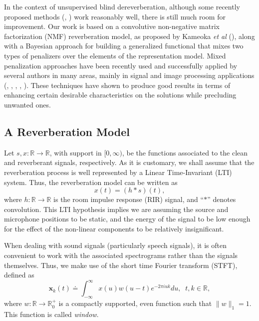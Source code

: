 \documentclass[12pt]{article}
\begin{document}
In the context of unsupervised blind dereverberation, although some recently proposed methods (\cite{wisdom2014}, \cite{kameoka2009}) work reasonably well, there is still much room for improvement. Our work is based on a convolutive non-negative matrix factorization (NMF) reverberation model, as proposed by Kameoka \emph{et al} (\cite{kameoka2009}), along with a Bayesian approach for building a generalized functional that mixes two types of penalizers over the elements of the representation model. Mixed penalization approaches have been recently used and successfully applied by several authors in many areas, mainly in signal and image processing applications (\cite{ibarrola2017l2bva}, \cite{lazzaro2015}, \cite{ibarrola2017inp}, \cite{peterson2017}, \cite{mazzieri2015}). These techniques have shown to produce good results in terms of enhancing certain desirable characteristics on the solutions while precluding unwanted ones.



\subsection{A Reverberation Model}

Let $s, x:\mathbb{R}\rightarrow\mathbb{R}$, with support in $[0, \infty)$, be the functions associated to the clean and reverberant signals, respectively. As it is customary, we shall assume that the reverberation process is well represented by a Linear Time-Invariant (LTI) system. Thus, the reverberation model can be written as
%
\begin{equation} \label{eq:cont-model}
x(t) = (h\ast s)(t),
\end{equation}
%
where $h:\mathbb{R}\rightarrow\mathbb{R}$ is the room impulse response (RIR) signal, and ``$\ast$'' denotes convolution. This LTI hypothesis implies we are assuming the source and microphone positions to be static, and the energy of the signal to be low enough for the effect of the non-linear components to be relatively insignificant.

When dealing with sound signals (particularly speech signals), it is often convenient to work with the associated spectrograms rather than the signals themselves. Thus, we make use of the short time Fourier transform (STFT), defined as
%
\begin{equation}\nonumber%
\mathbf{x}_k(t) \doteq \int_{-\infty}^{\infty}x(u)w(u-t)e^{-2\pi i u k}du,\;\;t,k\in\mathbb{R},
\end{equation}
%
where $w:\mathbb{R}\rightarrow\mathbb{R}^+_0$ is a compactly supported, even function such that $\|w\|_1 = 1$. This function is called \emph{window}.
\end{document}
